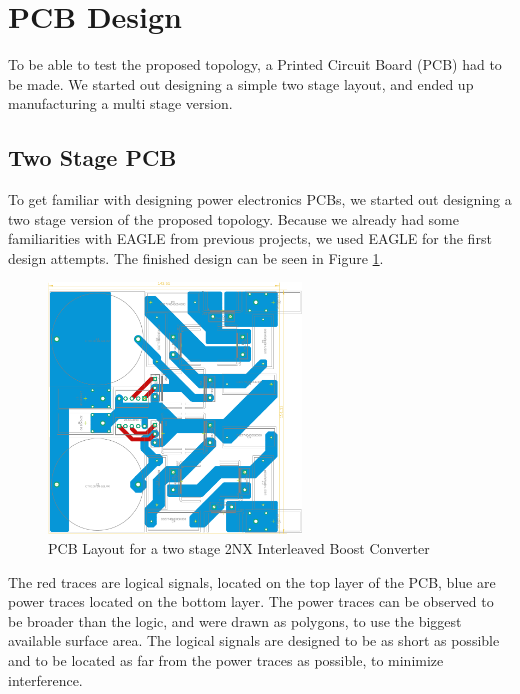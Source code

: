 \section{PCB Design}\label{sec:PCB}

To be able to test the proposed topology,
a Printed Circuit Board (PCB) had to be made.
We started out designing a simple two stage layout,
and ended up manufacturing a multi stage version.

\subsection{Two Stage PCB}
To get familiar with designing power electronics PCBs,
we started out designing a two stage version of the proposed topology.
Because we already had some familiarities with EAGLE from previous projects,
we used EAGLE for the first design attempts.
The finished design can be seen in Figure \ref{fig:2nxeagle}.

\begin{figure}[H]
	\begin{center}
	\includegraphics[width=0.6\textwidth]{figures/05cPCBdesign/2NX_interleaved_boost_converter_EAGLE_BY_DANIEL.pdf}
	\end{center}
	\caption{PCB Layout for a two stage 2NX Interleaved Boost Converter}
	\label{fig:2nxeagle}
\end{figure}

The red traces are logical signals,
located on the top layer of the PCB,
blue are power traces located on the bottom layer.
The power traces can be observed to be broader than the logic,
and were drawn as polygons,
to use the biggest available surface area.
The logical signals are designed to be as short as possible
and to be located as far from the power traces as possible,
to minimize interference.

